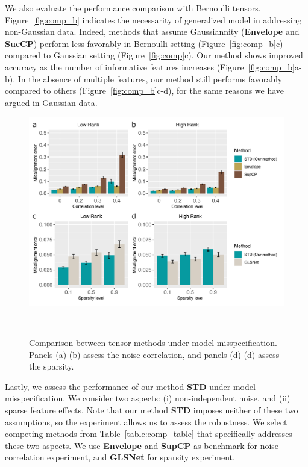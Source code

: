 \documentclass[12pt]{article}
\theoremstyle{definition}
\theoremstyle{definition}
\begin{document}
{We also evaluate the performance comparison with Bernoulli tensors. Figure~\ref{fig:comp_b} indicates the necessarity of generalized model in addressing non-Gaussian data. Indeed, methods that assume Gaussiannity (\textbf{Envelope} and \textbf{SucCP}) perform less favorably in Bernoulli setting (Figure~\ref{fig:comp_b}c) compared to Gaussian setting (Figure~\ref{fig:comp}c). Our method shows improved accuracy as the number of informative features increases (Figure~\ref{fig:comp_b}a-b). In the absence of multiple features, our method still performs favorably compared to others (Figure~\ref{fig:comp_b}c-d), for the same reasons we have argued in Gaussian data. 

\begin{figure}[t]
\centering
\includegraphics[width=12cm]{noniid_final.pdf} 
\caption{Comparison between tensor methods under model misspecification. Panels (a)-(b) assess the noise correlation, and panels (d)-(d) assess the sparsity. }~\label{fig:noniid}
\vspace{-.5cm}
 \end{figure}


Lastly, we assess the performance of our method {\bf STD} under model misspecification. We consider two aspects: (i) non-independent noise, and (ii) sparse feature effects. Note that our method {\bf STD} imposes neither of these two assumptions, so the experiment allows us to assess the robustness. We select competing methods from Table~\ref{table:comp_table} that specifically addresses these two aspects. We use {\bf Envelope} and {\bf SupCP} as benchmark for noise correlation experiment, and {\bf GLSNet} for sparsity experiment.

}
\end{document}
